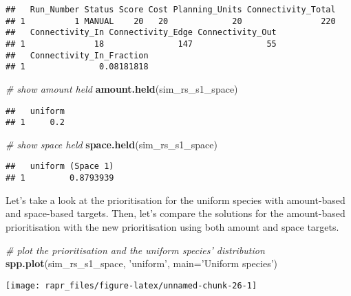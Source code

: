\documentclass[11pt,]{article}
\newenvironment{Shaded}{\begin{snugshade}}{\end{snugshade}}
\newcommand{\KeywordTok}[1]{\textcolor[rgb]{0.13,0.29,0.53}{\textbf{{#1}}}}
\newcommand{\DataTypeTok}[1]{\textcolor[rgb]{0.13,0.29,0.53}{{#1}}}
\newcommand{\StringTok}[1]{\textcolor[rgb]{0.31,0.60,0.02}{{#1}}}
\newcommand{\CommentTok}[1]{\textcolor[rgb]{0.56,0.35,0.01}{\textit{{#1}}}}
\newcommand{\NormalTok}[1]{{#1}}
\let\origfigure\figure
\let\endorigfigure\endfigure
\renewenvironment{figure}[1][2] {
	\expandafter\origfigure\expandafter[H]
} {
	\endorigfigure
}
\begin{document}
\begin{verbatim}
##   Run_Number Status Score Cost Planning_Units Connectivity_Total
## 1          1 MANUAL    20   20             20                220
##   Connectivity_In Connectivity_Edge Connectivity_Out
## 1              18               147               55
##   Connectivity_In_Fraction
## 1               0.08181818
\end{verbatim}

\begin{Shaded}
\begin{Highlighting}[]
\CommentTok{# show amount held}
\KeywordTok{amount.held}\NormalTok{(sim_rs_s1_space)}
\end{Highlighting}
\end{Shaded}

\begin{verbatim}
##   uniform
## 1     0.2
\end{verbatim}

\begin{Shaded}
\begin{Highlighting}[]
\CommentTok{# show space held}
\KeywordTok{space.held}\NormalTok{(sim_rs_s1_space)}
\end{Highlighting}
\end{Shaded}

\begin{verbatim}
##   uniform (Space 1)
## 1         0.8793939
\end{verbatim}

Let's take a look at the prioritisation for the uniform species with
amount-based and space-based targets. Then, let's compare the solutions
for the amount-based prioritisation with the new prioritisation using
both amount and space targets.

\begin{Shaded}
\begin{Highlighting}[]
\CommentTok{# plot the prioritisation and the uniform species' distribution}
\KeywordTok{spp.plot}\NormalTok{(sim_rs_s1_space, }\StringTok{'uniform'}\NormalTok{, }\DataTypeTok{main=}\StringTok{'Uniform species'}\NormalTok{)}
\end{Highlighting}
\end{Shaded}

\begin{figure}

{\centering \texttt{[image: rapr\_files/figure-latex/unnamed-chunk-26-1]} 

}

\caption{A prioritisation for the uniformly distributed species generated using amount-based targets (20\%) and space-based targets (85\%). See Figure 3 caption for conventions.}\label{fig:unnamed-chunk-26}
\end{figure}
\end{document}
